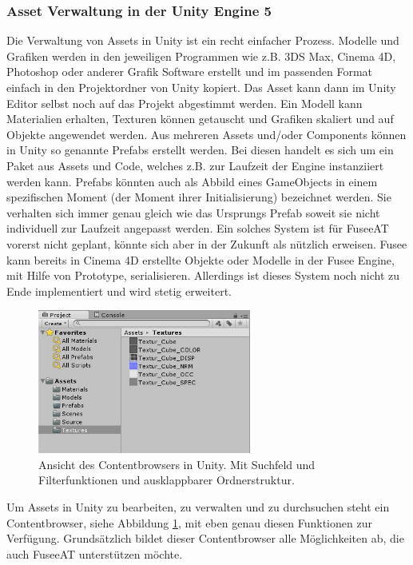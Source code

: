 \documentclass[pagesize, paper=a4, fontsize=12pt, titlepage=true, headings=small, headnosepline, abstractoff, liststotoc, nochapterprefix, plainheadsepline, twoside]{scrreprt}
\begin{document}
\subsubsection{Asset Verwaltung in der Unity Engine 5}
Die Verwaltung von Assets in Unity ist ein recht einfacher Prozess. Modelle und Grafiken werden in den jeweiligen Programmen wie z.B. 3DS Max, Cinema 4D, Photoshop oder anderer Grafik Software erstellt und im passenden Format einfach in den Projektordner von Unity kopiert. Das Asset kann dann im Unity Editor selbst noch auf das Projekt abgestimmt werden. Ein Modell kann Materialien erhalten, Texturen können getauscht und Grafiken skaliert und auf Objekte angewendet werden. Aus mehreren Assets und/oder Components können in Unity so genannte Prefabs erstellt werden. Bei diesen handelt es sich um ein Paket aus Assets und Code, welches z.B. zur Laufzeit der Engine instanziiert werden kann. Prefabs könnten auch als Abbild eines GameObjects in einem spezifischen Moment (der Moment ihrer Initialisierung) bezeichnet werden. Sie verhalten sich immer genau gleich wie das Ursprungs Prefab soweit sie nicht individuell zur Laufzeit angepasst werden. Ein solches System ist für FuseeAT vorerst nicht geplant, könnte sich aber in der Zukunft als nützlich erweisen. Fusee kann bereits in Cinema 4D erstellte Objekte oder Modelle in der Fusee Engine, mit Hilfe von Prototype, serialisieren. Allerdings ist dieses System noch nicht zu Ende implementiert und wird stetig erweitert.

\begin{figure}[ht]
	\centering
	\includegraphics[width=7cm]{Bilder/uContentbrowser.jpg}
	\caption{Ansicht des Contentbrowsers in Unity. Mit Suchfeld und Filterfunktionen und ausklappbarer Ordnerstruktur.}
	\label{UnityContentbrowser}
\end{figure}
Um Assets in Unity zu bearbeiten, zu verwalten und zu durchsuchen steht ein Contentbrowser, siehe Abbildung \ref{UnityContentbrowser}, mit eben genau diesen Funktionen zur Verfügung. Grundsätzlich bildet dieser Contentbrowser alle Möglichkeiten ab, die auch FuseeAT unterstützen möchte.
\end{document}
